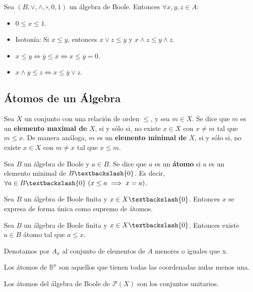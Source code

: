 \smallskip
\begin{properties}
    Sea $(B, \lor, \land, \overline{\square}, 0, 1)$ un álgebra de Boole. Entonces $\forall x,y,z \in A$:
    \begin{itemize}
        \item $0 \leq x \leq 1$.
        \item Isotonía: Si $x \leq y$, entonces $x \lor z \leq y$ y $x \land z \leq y \land z$.
        \item $x\leq y \Longleftrightarrow \overline{y} \leq \overline{x} \Longleftrightarrow x \leq \overline{y} = 0$.
        \item $x \land y \leq z \Longleftrightarrow x \leq \overline{y} \lor z$.
    \end{itemize}
\end{properties}

\subsection{Átomos de un Álgebra}
\begin{ndef}
    Sea $X$ un conjunto con una relación de orden $\leq$, y sea $m \in X$. Se dice que $m$ es un \textbf{elemento maximal de $X$}, si y sólo si, no existe $x \in X$ con $x \neq m$ tal que $m \leq x$.
    De manera análoga, $m$ es un \textbf{elemento minimal de $X$}, si y sólo si, no existe $x \in X$ con $m \neq x$ tal que $x \leq m$.
\end{ndef}
\begin{ndef}[Átomo]
    Sea $B$ un álgebra de Boole y $a \in B$. Se dice que $a$ es un \textbf{átomo} si $a$ es un elemento minimal de $B \textbackslash \{0\}$. Es decir,
    $\forall a \in B \textbackslash \{0\} \ (x \leq a \implies x = a)$.
\end{ndef}
\begin{nth}
    Sea $B$ un álgebra de Boole finita y $x \in X \textbackslash \{0\}$. Entonces $x$ se expresa de forma única como supremo de átomos.
\end{nth}
\begin{lema}
    Sea $B$ un álgebra de Boole finita y $x \in X \textbackslash \{0\}$. Entonces existe $a \in B$ átomo tal que $a \leq x$.
\end{lema}
\begin{nota}
    Denotamos por $A_x$ al conjunto de elementos de $A$ menores o iguales que x.
\end{nota}

\begin{ejemplo}
    Los átomos de $\mathbb{B}^n$ son aquellos que tienen todas las coordenadas nulas menos una.
\end{ejemplo}
\begin{ejemplo}
    Los átomos del álgebra de Boole de $\mathcal{P}(X)$ son los conjuntos unitarios.
\end{ejemplo}

